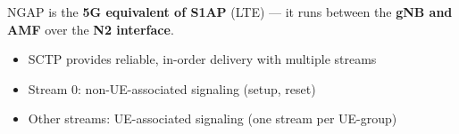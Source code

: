 NGAP is the \textbf{5G equivalent of S1AP} (LTE) — it runs between the \textbf{gNB and AMF} over the \textbf{N2 interface}.



\begin{itemize}
\tightlist
\item
  SCTP provides reliable, in-order delivery with multiple streams
\item
  Stream 0: non-UE-associated signaling (setup, reset)
\item
  Other streams: UE-associated signaling (one stream per UE-group)
\end{itemize}



